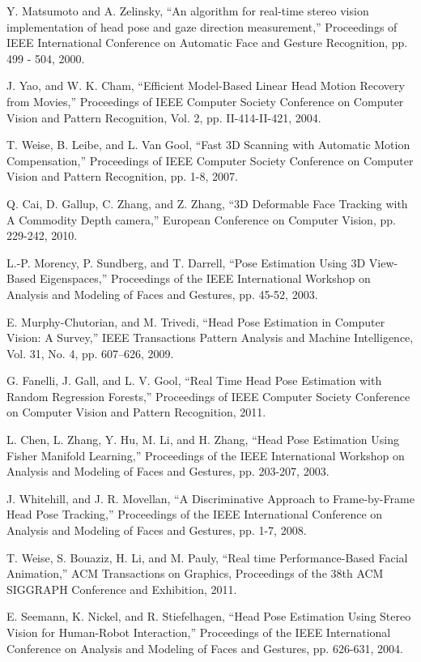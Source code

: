 \begin{thebibliography}{}
Y. Matsumoto and A. Zelinsky, “An algorithm for real-time stereo vision implementation of head pose and gaze direction measurement,” Proceedings of IEEE International Conference on  Automatic Face and Gesture Recognition, pp. 499 - 504, 2000.

J. Yao, and W. K. Cham, “Efficient Model-Based Linear Head Motion Recovery from Movies,” Proceedings of IEEE Computer Society Conference on Computer Vision and Pattern Recognition, Vol. 2, pp. II-414-II-421,  2004.

T. Weise, B. Leibe, and L. Van Gool, “Fast 3D Scanning with Automatic Motion Compensation,” Proceedings of IEEE Computer Society Conference on Computer Vision and Pattern Recognition, pp. 1-8, 2007.

Q. Cai, D. Gallup, C. Zhang, and Z. Zhang, “3D Deformable Face Tracking with A Commodity Depth camera,” European Conference on Computer Vision, pp. 229-242, 2010.

L.-P. Morency, P. Sundberg, and T. Darrell, “Pose Estimation Using 3D View-Based Eigenspaces,” Proceedings of the IEEE International Workshop on Analysis and Modeling of Faces and Gestures, pp. 45-52, 2003.

E. Murphy-Chutorian, and M. Trivedi, “Head Pose Estimation in Computer Vision: A Survey,” IEEE Transactions Pattern Analysis and Machine Intelligence, Vol. 31, No. 4, pp. 607–626,  2009.

G. Fanelli, J. Gall, and L. V. Gool, “Real Time Head Pose Estimation with Random Regression Forests,” Proceedings of IEEE Computer Society Conference on Computer Vision and Pattern Recognition, 2011.

L. Chen, L. Zhang, Y. Hu, M. Li, and H. Zhang, “Head Pose Estimation Using Fisher Manifold Learning,” Proceedings of the IEEE International Workshop on Analysis and Modeling of Faces and Gestures, pp. 203-207, 2003.
 
J. Whitehill, and J. R. Movellan, “A Discriminative Approach to Frame-by-Frame Head Pose Tracking,” Proceedings of the IEEE International Conference on Analysis and Modeling of Faces and Gestures, pp. 1-7, 2008.

T. Weise, S. Bouaziz, H. Li, and M. Pauly, “Real time Performance-Based Facial Animation,” ACM Transactions on Graphics, Proceedings of the 38th ACM SIGGRAPH Conference and Exhibition, 2011.

E. Seemann, K. Nickel, and R. Stiefelhagen, “Head Pose Estimation Using Stereo Vision for Human-Robot Interaction,” Proceedings of the IEEE International Conference on Analysis and Modeling of Faces and Gestures, pp. 626-631, 2004.




\end{thebibliography}



